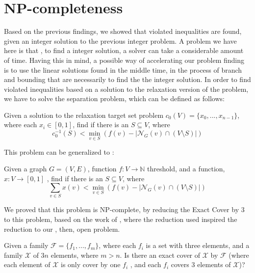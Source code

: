 
\section{NP-completeness}

Based on the previous findings, we showed that violated inequalities are found, given an integer solution to the previous integer problem.  A problem we have here is that , to find a integer solution, a solver can take a considerable amount of time. Having this in mind, a possible way of accelerating our problem finding is to use the linear solutions found in the middle time, in the process of branch and bounding that are necessarily to find the the integer solution. In order to find violated inequalities based on a solution to the relaxation version of the problem, we have to solve the separation problem, which can be defined as follows:

\begin{mydef}
Given a solution to the relaxation target set problem $c_0(V) = \{ x_0, ..., x_{n-1} \}$, where each $x_i \in [0,1]$,  find if there is an $S \subseteq V$, where   
\begin{equation}
c_0^{-1}(S) <  \min_{v \in S} (f(v) - |\mathcal{N}_G(v) \cap (V \setminus S)| ) 
\end{equation}
\end{mydef}

This problem can be generalized to :
\begin{mydef}
Given a graph $G = (V, E)$,  function $f: V\rightarrow \mathbb{N}$  threshold, and a function,  $x: V \rightarrow [0, 1]$ , find if there is an $S \subseteq V$, where   
\begin{equation}
 \displaystyle\sum\limits_{v \in S} x(v)   <  \min_{v \in S} (f(v) - |\mathcal{N}_G(v) \cap (V \setminus S)| ) 
\end{equation}
\end{mydef}

We proved that this problem is NP-complete, by reducing the Exact Cover by 3 to this problem, based on the work of \citep{Araujo2018}, where the reduction used inspired the reduction to our , then, open problem.
\begin{mydef}
Given a family $\mathcal{F} = \{f_1, ..., f_m\}$, where each $f_i $ is a set with three elements, and a family $\mathcal{X}$ of $3n$ elements, where $m > n$. Is there an exact cover of $\mathcal{X}$ by $\mathcal{F}$ (where each element of $\mathcal{X}$ is only cover by  one $f_i$ , and each $f_i$ covers 3 elements of $\mathcal{X}$)?
\end{mydef}


